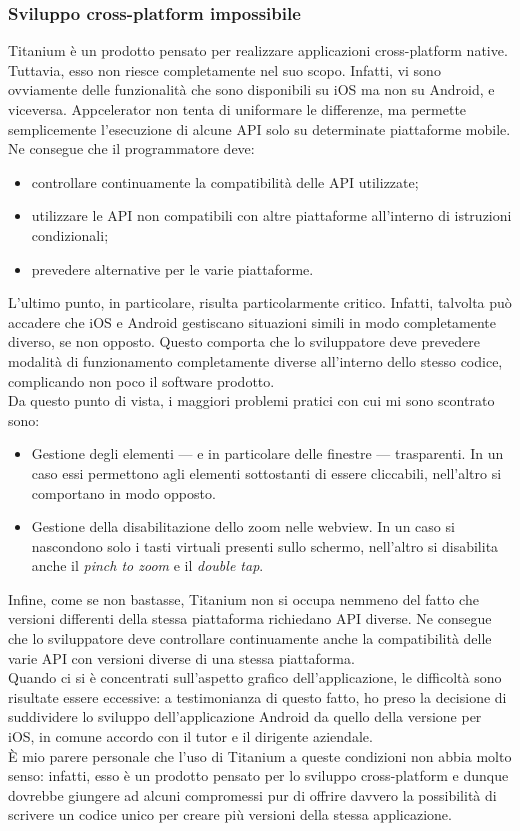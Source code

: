 			\subsubsection{Sviluppo cross-platform impossibile}
				Titanium è un prodotto pensato per realizzare applicazioni cross-platform native. Tuttavia, esso non riesce
				completamente nel suo scopo. Infatti, vi sono ovviamente delle funzionalità che sono disponibili su iOS ma non su
				Android, e viceversa. Appcelerator non tenta di uniformare le differenze, ma permette semplicemente l'esecuzione di
				alcune API solo su determinate piattaforme mobile. Ne consegue che il programmatore deve:
				\begin{itemize}
					\item controllare continuamente la compatibilità delle API utilizzate;
					\item utilizzare le API non compatibili con altre piattaforme all'interno di istruzioni condizionali;
					\item prevedere alternative per le varie piattaforme.
				\end{itemize}
				L'ultimo punto, in particolare, risulta particolarmente critico. Infatti, talvolta può accadere che iOS e Android
				gestiscano situazioni simili in modo completamente diverso, se non opposto. Questo comporta che lo sviluppatore deve
				prevedere modalità di funzionamento completamente diverse all'interno dello stesso codice, complicando non poco il
				software prodotto.\\
				Da questo punto di vista, i maggiori problemi pratici con cui mi sono scontrato sono:
				\begin{itemize}
					\item Gestione degli elementi — e in particolare delle finestre — trasparenti. In un caso essi permettono
					agli elementi sottostanti di essere cliccabili, nell'altro si comportano in modo opposto.
					\item Gestione della disabilitazione dello zoom nelle webview. In un caso si nascondono solo i tasti virtuali
					presenti sullo schermo, nell'altro si disabilita anche il \emph{pinch to zoom} e il \emph{double tap}.
				\end{itemize}
				Infine, come se non bastasse, Titanium non si occupa nemmeno del fatto che versioni differenti della stessa
				piattaforma richiedano API diverse. Ne consegue che lo sviluppatore deve controllare continuamente anche 
				la compatibilità delle varie API con versioni diverse di una stessa piattaforma.\\
				Quando ci si è concentrati sull'aspetto grafico	dell'applicazione, le difficoltà sono risultate essere eccessive: a
				testimonianza di questo fatto, ho preso la decisione di suddividere lo sviluppo dell'applicazione Android da quello
				della versione per iOS, in comune accordo con il tutor e il dirigente aziendale.\\
				È mio parere personale che l'uso di Titanium a queste condizioni non abbia molto senso: infatti, esso è un prodotto
				pensato per lo sviluppo cross-platform e dunque dovrebbe giungere ad alcuni compromessi pur di offrire davvero
				la possibilità di scrivere un codice unico per creare più versioni della stessa applicazione.
